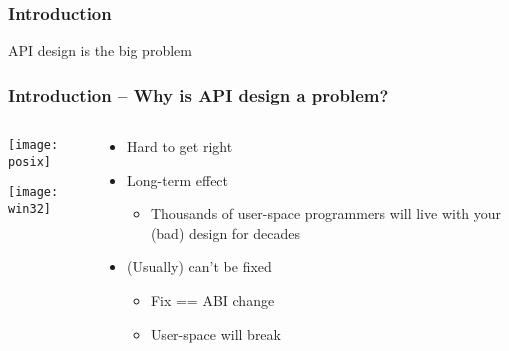 \begin{frame}[plain]
	\frametitle{Introduction}
	
	\begin{center}
		\Huge 
		API design is the big problem				
		
	\end{center}
	
	
\end{frame}

\begin{frame}[plain]
	\frametitle{Introduction -- Why is API design a problem?}

	\begin{columns}
	
	\begin{column}{.4\textwidth}
		\centering
		\texttt{[image: posix]}
		
		\texttt{[image: win32]}
	\end{column}
	
	\begin{column}{.6\textwidth}
	\large
	\begin{itemize}
	\item Hard to get right
	\item Long-term effect
	\begin{itemize}
		\item Thousands of user-space
		programmers will live with your
		(bad) design for decades
		
	\end{itemize}
	
	\item (Usually) can’t be fixed
	\begin{itemize}
		\item Fix == ABI change
		\item User-space will break
		
	\end{itemize}
	\end{itemize}

\end{column}
\end{columns}

\end{frame}



